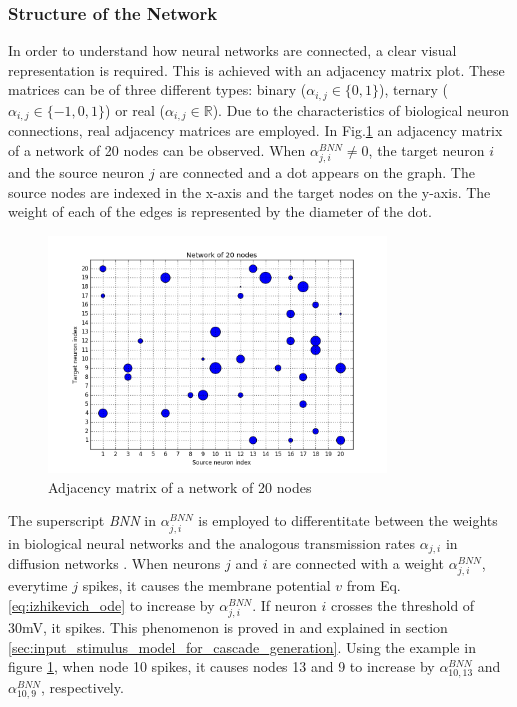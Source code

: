 \documentclass[11pt]{article}
\begin{document}
\subsubsection{Structure of the Network}

In order to understand how neural networks are connected, a clear visual representation is required. This is achieved with an adjacency matrix plot. These matrices can be of three different types: binary ($\alpha_{i,j}\in\{0,1\}$), ternary ($\alpha_{i,j}\in\{-1,0,1\}$) or real ($\alpha_{i,j}\in \mathbb{R}$). Due to the characteristics of biological neuron connections, real adjacency matrices are employed. In Fig.\ref{fig:graph_20_nodes} an adjacency matrix of a network of 20 nodes can be observed. When $\alpha_{j,i}^{BNN}\neq 0$, the target neuron $i$ and the source neuron $j$ are connected and a dot appears on the graph. The source nodes are indexed in the x-axis and the target nodes on the y-axis. The weight of each of the edges is represented by the diameter of the dot. 

\begin{figure}
  \centering
  \includegraphics[width=0.8\textwidth]{graph_20_nodes.png}
  \caption{Adjacency matrix of a network of 20 nodes}
	\label{fig:graph_20_nodes}
\end{figure}

The superscript \textit{BNN} in $\alpha_{j,i}^{BNN}$ is employed to differentitate between the weights in biological neural networks and the analogous transmission rates $\alpha_{j,i}$ in diffusion networks \cite{pranav_report}. When neurons $j$ and $i$ are connected with a weight $\alpha_{j,i}^{BNN}$, everytime $j$ spikes, it causes the membrane potential $v$ from Eq.\ref{eq:izhikevich_ode} to increase by $\alpha_{j,i}^{BNN}$. If neuron $i$ crosses the threshold of 30mV, it spikes. This phenomenon is proved in \cite{alexandru2018estimating} and explained in section \ref{sec:input_stimulus_model_for_cascade_generation}. Using the example in figure \ref{fig:graph_20_nodes}, when node 10 spikes, it causes nodes 13 and 9 to increase by $\alpha_{10,13}^{BNN}$ and $\alpha_{10,9}^{BNN}$, respectively. 
\end{document}
